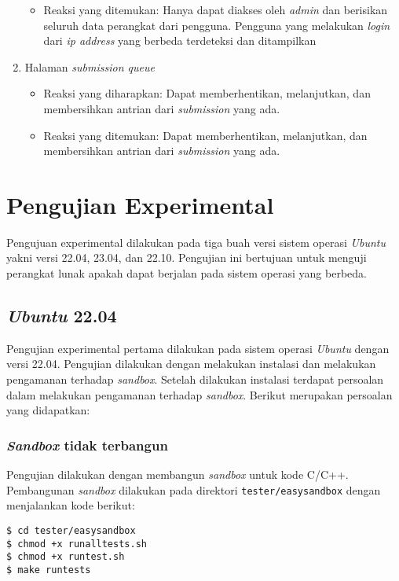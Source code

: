 \begin{enumerate}
\begin{itemize}
	 	\item Reaksi yang ditemukan: Hanya dapat diakses oleh \textit{admin} dan berisikan seluruh data perangkat dari pengguna. Pengguna yang melakukan \textit{login} dari \textit{ip address} yang berbeda terdeteksi dan ditampilkan
	 \end{itemize}
	 \item Halaman \textit{submission queue}
	 \begin{itemize}
	 	\item Reaksi yang diharapkan: Dapat memberhentikan, melanjutkan, dan membersihkan antrian dari \textit{submission} yang ada.
	 	\item Reaksi yang ditemukan: Dapat memberhentikan, melanjutkan, dan membersihkan antrian dari \textit{submission} yang ada.
	 \end{itemize}
\end{enumerate}

\section{Pengujian Experimental}
Pengujuan experimental dilakukan pada tiga buah versi sistem operasi \textit{Ubuntu} yakni versi 22.04, 23.04, dan 22.10. Pengujian ini bertujuan untuk menguji perangkat lunak apakah dapat berjalan pada sistem operasi yang berbeda.

\subsection{\textit{Ubuntu} 22.04}
Pengujian experimental pertama dilakukan pada sistem operasi \textit{Ubuntu} dengan versi 22.04. Pengujian dilakukan dengan melakukan instalasi dan melakukan pengamanan terhadap \textit{sandbox}. Setelah dilakukan instalasi terdapat persoalan dalam melakukan pengamanan terhadap \textit{sandbox}. Berikut merupakan persoalan yang didapatkan:
\subsubsection{\textit{Sandbox} tidak terbangun}
Pengujian dilakukan dengan membangun \textit{sandbox} untuk kode C/C++. Pembangunan \textit{sandbox} dilakukan pada direktori \texttt{tester/easysandbox} dengan menjalankan kode berikut:
\begin{lstlisting}[caption=Pembangunan \textit{sandbox} pada \textit{Ubuntu} 22.04, label=kode:sandbox2204]
$ cd tester/easysandbox
$ chmod +x runalltests.sh
$ chmod +x runtest.sh
$ make runtests
\end{lstlisting}

